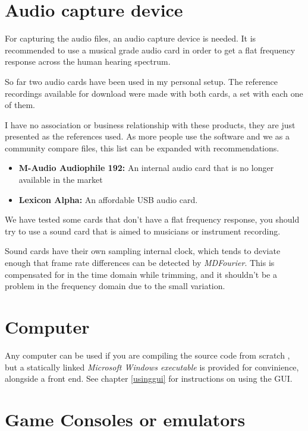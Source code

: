 \documentclass[10pt,a4paper]{report}
\begin{document}
\section{Audio capture device}

For capturing the audio files, an audio capture device is needed. It is recommended to use a musical grade audio card in order to get a flat frequency response across the human hearing spectrum.

So far two audio cards have been used in my personal setup. The reference recordings available for download were made with both cards, a set with each one of them.

I have no association or business relationship with these products, they are just presented as the references used. As more people use the software and we as a community compare files, this list can be expanded with recommendations.

\begin{itemize}
	\item \textbf{M-Audio Audiophile 192:} An internal audio card that is no longer available in the market \cite{maudio}
	\item \textbf{Lexicon Alpha:} An affordable USB audio card. \cite{lexicon}
\end{itemize}

We have tested some cards that don't have a flat frequency response, you should try to use a sound card that is aimed to musicians or instrument recording.

Sound cards have their own sampling internal clock, which tends to deviate enough that frame rate differences can be detected by \textit{MDFourier}. This is compensated for in the time domain while trimming, and it shouldn't be a problem in the frequency domain due to the small variation. \cite{SoundCardClock}

\section{Computer}

Any computer can be used if you are compiling the source code from scratch \cite{sourcecode}, but a statically linked \textit{Microsoft Windows executable} is provided for convinience, alongside a front end. See chapter \ref{usinggui} for instructions on using the GUI.

\section{Game Consoles or emulators}
\end{document}

